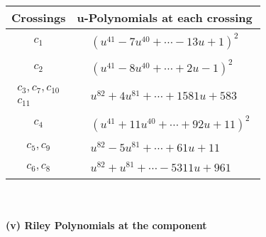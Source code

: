 \documentclass[1p]{elsarticle_modified}
\theoremstyle{definition}
\begin{document}
\begin{tabular}{m{50pt}|m{274pt}}
Crossings & \hspace{64pt}u-Polynomials at each crossing \\
\hline $$\begin{aligned}c_{1}\end{aligned}$$&$\begin{aligned}
&(u^{41}-7 u^{40}+\cdots-13 u+1)^{2}
\end{aligned}$\\
\hline $$\begin{aligned}c_{2}\end{aligned}$$&$\begin{aligned}
&(u^{41}-8 u^{40}+\cdots+2 u-1)^{2}
\end{aligned}$\\
\hline $$\begin{aligned}c_{3},c_{7},c_{10}\\c_{11}\end{aligned}$$&$\begin{aligned}
&u^{82}+4 u^{81}+\cdots+1581 u+583
\end{aligned}$\\
\hline $$\begin{aligned}c_{4}\end{aligned}$$&$\begin{aligned}
&(u^{41}+11 u^{40}+\cdots+92 u+11)^{2}
\end{aligned}$\\
\hline $$\begin{aligned}c_{5},c_{9}\end{aligned}$$&$\begin{aligned}
&u^{82}-5 u^{81}+\cdots+61 u+11
\end{aligned}$\\
\hline $$\begin{aligned}c_{6},c_{8}\end{aligned}$$&$\begin{aligned}
&u^{82}+u^{81}+\cdots-5311 u+961
\end{aligned}$\\
\hline
\end{tabular}\\~\\
\newpage\renewcommand{\arraystretch}{1}
\flushleft \textbf{(v) Riley Polynomials at the component}\newline \\
\end{document}

